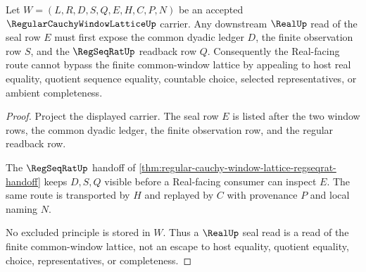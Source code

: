 \begin{theorem}
\label{thm:regular-cauchy-window-lattice-real-seal-nonescape}
Let $W=(L,R,D,S,Q,E,H,C,P,N)$ be an accepted $\RegularCauchyWindowLatticeUp$ carrier. Any downstream $\RealUp$ read of the seal row $E$ must first expose the common dyadic ledger $D$, the finite observation row $S$, and the $\RegSeqRatUp$ readback row $Q$. Consequently the Real-facing route cannot bypass the finite common-window lattice by appealing to host real equality, quotient sequence equality, countable choice, selected representatives, or ambient completeness.
\end{theorem}
\begin{proof}
Project the displayed carrier. The seal row $E$ is listed after the two window rows, the common dyadic ledger, the finite observation row, and the regular readback row.

The $\RegSeqRatUp$ handoff of \autoref{thm:regular-cauchy-window-lattice-regseqrat-handoff} keeps $D,S,Q$ visible before a Real-facing consumer can inspect $E$. The same route is transported by $H$ and replayed by $C$ with provenance $P$ and local naming $N$.

No excluded principle is stored in $W$. Thus a $\RealUp$ seal read is a read of the finite common-window lattice, not an escape to host equality, quotient equality, choice, representatives, or completeness.
\end{proof}


\begin{closurestatus}{\RegularCauchyWindowLatticeUp}
  \theoryclosure{\seedClosure}
  \formalstatus{\unformalizedV}
\end{closurestatus}
